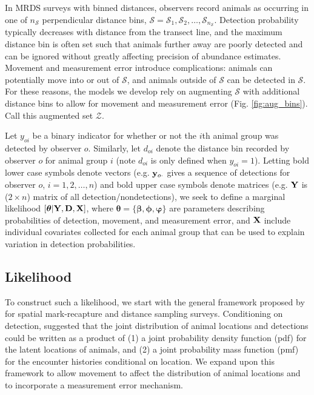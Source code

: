 \documentclass[12pt,fleqn]{article}
\begin{document}
In MRDS surveys with binned distances, observers record animals as occurring in one of $n_\mathcal{S}$ perpendicular distance bins, $\mathcal{S} = \mathcal{S}_1,\mathcal{S}_2,\hdots,\mathcal{S}_{n_\mathcal{S}}$.  Detection probability typically decreases with distance from the transect line, and the maximum distance bin is often set such that animals further away are poorly detected and can be ignored without greatly affecting precision of abundance estimates.  Movement and measurement error introduce complications: animals can potentially move into or out of $\mathcal{S}$, and animals outside of $\mathcal{S}$ can be detected in $\mathcal{S}$.  For these reasons, the models we develop rely on augmenting $\mathcal{S}$ with additional distance bins to allow for movement and measurement error (Fig. \ref{fig:aug_bins}).  Call this augmented set $\mathcal{Z}$.

Let $y_{oi}$ be a binary indicator for whether or not the $i$th animal group was detected by observer $o$.  Similarly, let $d_{oi}$ denote the distance bin recorded by observer $o$ for animal group $i$ (note $d_{oi}$ is only defined when $y_{oi}=1$). Letting bold lower case symbols denote vectors (e.g. ${\bf y}_{o \cdot}$ gives a sequence of detections for observer $o$, $i=1,2,\hdots,n$) and bold upper case symbols denote matrices (e.g. ${\bf Y}$ is ($2 \times n$) matrix of all detection/nondetections),  we seek to define a marginal likelihood $[\boldsymbol{\theta} | {\bf Y},{\bf D}, {\bf X}]$, where $\boldsymbol{\theta}= \{ \boldsymbol{\beta,\phi,\varphi} \}$ are parameters describing probabilities of detection, movement, and measurement error, and ${\bf X}$ include individual covariates collected for each animal group that can be used to explain variation in detection probabilities.

\subsection{Likelihood}

To construct such a likelihood, we start with the general framework proposed by \citet{BorchersEtAl2015} for spatial mark-recapture and distance sampling surveys.  Conditioning on detection, \citet{BorchersEtAl2015} suggested that the joint distribution of animal locations and detections could be written as a product of (1) a joint probability density function (pdf) for the latent locations of animals, and (2) a joint probability mass function (pmf) for the encounter histories conditional on location.  We expand upon this framework to allow movement to affect the distribution of animal locations and to incorporate a measurement error mechanism.
\end{document}
